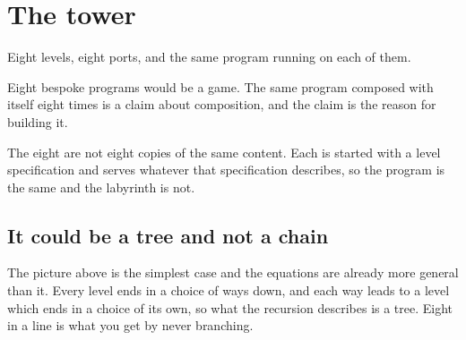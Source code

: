 \documentclass[11pt,a4paper]{article}
\begin{document}
\section{The tower}
\label{sec:tower}

Eight levels, eight ports, and the same program running on each of them.

\begin{center}
\end{center}

Eight bespoke programs would be a game. The same program composed with itself eight times is a
claim about composition, and the claim is the reason for building it.

The eight are not eight copies of the same content. Each is started with a level specification
and serves whatever that specification describes, so the program is the same and the labyrinth
is not.

\subsection{It could be a tree and not a chain}

The picture above is the simplest case and the equations are already more general than it. Every
level ends in a choice of ways down, and each way leads to a level which ends in a choice of its
own, so what the recursion describes is a tree. Eight in a line is what you get by never
branching.
\end{document}
